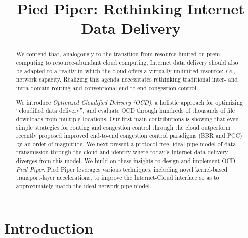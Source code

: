 \documentclass[newfonts=false,format=sigconf,anonymous,10pt,letterpaper]{acmart}
\title{Pied Piper: Rethinking Internet Data Delivery}
\author{}
\date{}
\providecommand{\ie}{\emph{i.e.,} }
\newcommand{\name}{Pied Piper\xspace}
\begin{document}
 \sloppypar


\begin{abstract}

We contend that, analogously to the transition from resource-limited on-prem computing to resource-abundant cloud computing, Internet data delivery should also be adapted to a reality in which the cloud offers a virtually unlimited resource: \ie network capacity. Realizing this agenda necessitates rethinking traditional inter- and intra-domain routing and conventional end-to-end congestion control.

We introduce \textit{Optimized Cloudified Delivery (OCD)}, a holistic approach for optimizing ``cloudified data delivery'', and evaluate OCD through hundreds of thousands of file downloads from multiple locations. Our first main contributions is showing that even simple strategies for routing and congestion control through the cloud outperform recently proposed improved end-to-end congestion control paradigms (BBR and PCC) by an order of magnitude. We next present a protocol-free, ideal pipe model of data transmission through the cloud and identify where today's Internet data delivery diverges from this model. We build on these insights to design and implement OCD \textit{\name}. \name leverages various techniques, including novel kernel-based transport-layer accelerations, to improve the Internet-Cloud interface so as to approximately match the ideal network pipe model.
\end{abstract}




\maketitle





\section{Introduction}

{\let\thefootnote\relax{}}
\end{document}
